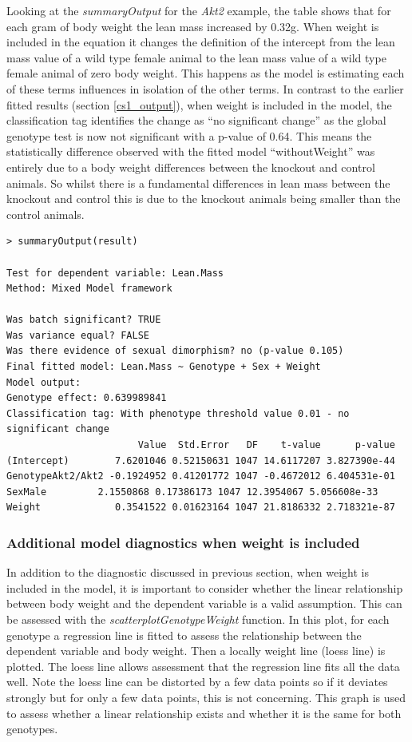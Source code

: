 \documentclass[12pt,a4paper]{article}
\begin{document}
Looking at the \textit{summaryOutput} for the \textit{Akt2} example, the table shows that for each gram of body weight the lean mass increased by 0.32g.  
When weight is included in the equation it changes the definition of the intercept from the lean mass value of a wild type female animal to the lean mass value of a wild type female animal of zero body weight. 
This happens as the model is estimating each of these terms influences in isolation of the other terms. 
In contrast to the earlier fitted results (section \ref{cs1_output}), when weight is included in the model, the classification tag identifies the change as “no significant change” 
as the global genotype test is now not significant with a p-value of 0.64.  
This means the statistically difference observed with the fitted model “withoutWeight” was entirely due to a body weight differences between the knockout and control animals.  
So whilst there is a fundamental differences in lean mass between the knockout and control this is due to the knockout animals being smaller than the control animals. 

\begingroup
    \fontsize{8pt}{12pt}\selectfont
\begin{verbatim}
> summaryOutput(result)

Test for dependent variable: Lean.Mass
Method: Mixed Model framework

Was batch significant? TRUE
Was variance equal? FALSE
Was there evidence of sexual dimorphism? no (p-value 0.105)
Final fitted model: Lean.Mass ~ Genotype + Sex + Weight
Model output:
Genotype effect: 0.639989841
Classification tag: With phenotype threshold value 0.01 - no significant change
                       Value  Std.Error   DF    t-value      p-value
(Intercept)        7.6201046 0.52150631 1047 14.6117207 3.827390e-44
GenotypeAkt2/Akt2 -0.1924952 0.41201772 1047 -0.4672012 6.404531e-01
SexMale         2.1550868 0.17386173 1047 12.3954067 5.056608e-33
Weight             0.3541522 0.01623164 1047 21.8186332 2.718321e-87

\end{verbatim}
\endgroup


\subsubsection{Additional model diagnostics when weight is included}
In addition to the diagnostic discussed in previous section, when weight is included in the model, it is important to consider whether the linear relationship between body weight and the dependent variable is a valid assumption. 
This can be assessed with the \textit{scatterplotGenotypeWeight} function. 
In this plot, for each genotype a regression line is fitted to assess the relationship between the dependent variable and body weight. 
Then a locally weight line (loess line) is plotted. 
The loess line allows assessment that the regression line fits all the data well.
Note the loess line can be distorted by a few data points so if it deviates strongly but for only a few data points, this is not concerning.  
This graph is used to assess whether a linear relationship exists and whether it is the same for both genotypes.  
\end{document}
